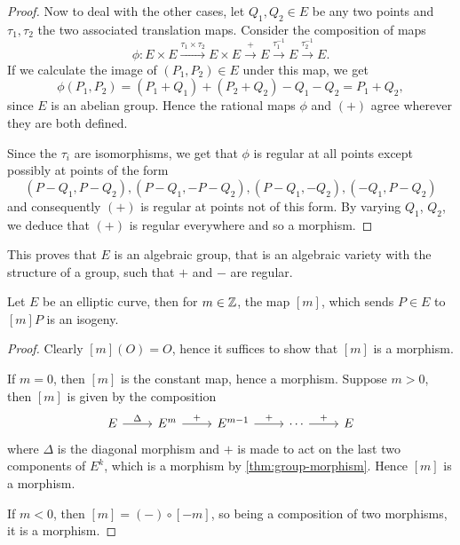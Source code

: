 \begin{proof}
	Now to deal with the other cases, let $Q_1, Q_2 \in E$ be any two points
	and $\tau_1, \tau_2$ the two associated translation maps. Consider the
	composition of maps
	\begin{equation*}
		\phi: E\times E \xrightarrow{\tau_1\times\tau_2} E \times E
		\xrightarrow{+}E\xrightarrow{\tau_1^{-1}}E\xrightarrow{\tau_2^{-1}}E.
	\end{equation*}
	If we calculate the image of $(P_1, P_2) \in E$ under this map, we get
	\begin{equation*}
		\phi(P_1, P_2) = (P_1 + Q_1) + (P_2 + Q_2) - Q_1 - Q_2 = P_1 + Q_2,
	\end{equation*}
	since $E$ is an abelian group.
	Hence the rational maps $\phi$ and $(+)$ agree
	wherever they are both defined.

	Since the $\tau_i$ are isomorphisms, we get that $\phi$ is regular at all
	points except possibly at points of the form
	\begin{equation*}
		(P - Q_1, P - Q_2), (P-Q_1, -P - Q_2), (P - Q_1, -Q_2), (-Q_1, P-Q_2)
	\end{equation*}
	and consequently $(+)$ is regular at points not of this form.
	By varying $Q_1$, $Q_2$, we deduce that $(+)$ is regular everywhere
	and so a morphism.
\end{proof}
This proves that $E$ is an algebraic group, that is an algebraic variety
with the structure of a group, such that $+$ and $-$ are regular.


\begin{corollary}
	Let $E$ be an elliptic curve, then for $m \in \mathbb{Z}$, the map $[m]$, which
	sends $P \in E$ to $[m]P$ is an isogeny.
\end{corollary}

\begin{proof}
	Clearly $[m](O) = O$, hence it suffices to show that $[m]$ is a morphism.

	If $m = 0$, then $[m]$ is the constant map, hence a morphism.
	Suppose $m > 0$, then $[m]$ is given by the composition
	\begin{equation*}
		\begin{tikzcd}
			E & {E^m} & {E^{m-1}} & \cdots & E
			\arrow["{\Delta}", from=1-1, to=1-2]
			\arrow["{+}", from=1-2, to=1-3]
			\arrow["+", from=1-3, to=1-4]
			\arrow["+", from=1-4, to=1-5]
		\end{tikzcd}
	\end{equation*}
	where $\Delta$ is the diagonal morphism and $+$ is made to act on the
	last two components of $E^k$, which is a morphism by
	\ref{thm:group-morphism}. Hence $[m]$ is a morphism.

	If $m < 0$, then $[m] = (-)\circ[-m]$, so being a composition of two
	morphisms, it is a morphism.
\end{proof}

